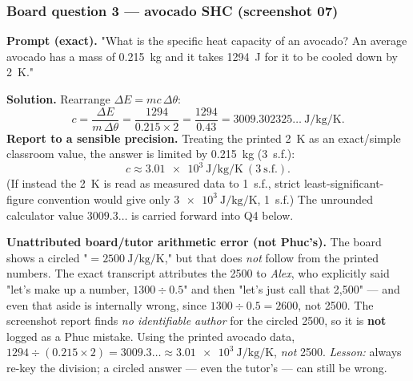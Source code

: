 \documentclass[11pt,a4paper]{article}
\newcommand{\dtheta}{\Delta\theta}
\newcommand{\dE}{\Delta E}
\begin{document}
\subsubsection*{Board question 3 --- avocado SHC (screenshot 07)}
\begin{plainbox}
\textbf{Prompt (exact).} "What is the specific heat capacity of an avocado? An average
avocado has a mass of \SI{0.215}{\kilogram} and it takes \SI{1294}{\joule} for it to be
cooled down by \SI{2}{\kelvin}."

\smallskip
\textbf{Solution.} Rearrange $\dE = mc\,\dtheta$:
\[
c = \frac{\dE}{m\,\dtheta} = \frac{1294}{0.215 \times 2}
  = \frac{1294}{0.43} = 3009.302325\ldots\ \si{\joule\per\kilogram\per\kelvin}.
\]
\textbf{Report to a sensible precision.} Treating the printed \SI{2}{\kelvin} as an
exact/simple classroom value, the answer is limited by \SI{0.215}{\kilogram} (3~s.f.):
\[
\boxed{c \approx \SI{3.01e3}{\joule\per\kilogram\per\kelvin}\ (3~\text{s.f.})}.
\]
(If instead the \SI{2}{\kelvin} is read as measured data to 1~s.f., strict
least-significant-figure convention would give only $\SI{3e3}{\joule\per\kilogram\per\kelvin}$,
1~s.f.) The unrounded calculator value $3009.3\ldots$ is carried forward into Q4 below.
\end{plainbox}

\begin{watchbox}
\textbf{Unattributed board/tutor arithmetic error (not Phuc's).} The board shows a circled
"$= \SI{2500}{\joule\per\kilogram\per\kelvin}$," but that does \emph{not} follow from the
printed numbers. The exact transcript attributes the 2500 to \emph{Alex}, who explicitly
said "let's make up a number, $1300 \div 0.5$" and then "let's just call that 2,500" ---
and even that aside is internally wrong, since $1300 \div 0.5 = 2600$, not 2500. The
screenshot report finds \emph{no identifiable author} for the circled 2500, so it is
\textbf{not} logged as a Phuc mistake. Using the printed avocado data,
$1294 \div (0.215 \times 2) = 3009.3\ldots \approx \SI{3.01e3}{\joule\per\kilogram\per\kelvin}$,
\emph{not} 2500. \emph{Lesson:} always re-key the division; a circled answer --- even the
tutor's --- can still be wrong.
\end{watchbox}
\end{document}
